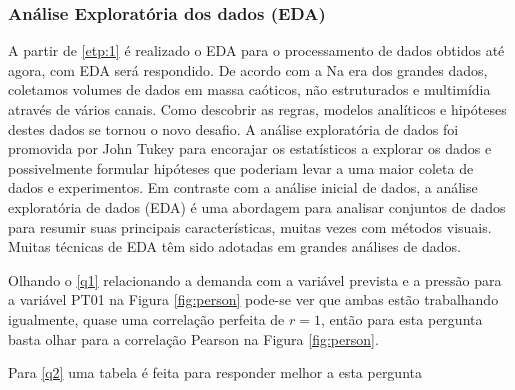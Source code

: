 \subsubsection{An\'alise Explorat\'oria dos dados (EDA)}

A partir de \ref{etp:1} é realizado o EDA para o processamento de dados obtidos até agora, com EDA será respondido. De acordo com a  Na era dos grandes dados, coletamos volumes de dados em massa caóticos, não estruturados e multimídia através de vários canais. Como descobrir as regras, modelos analíticos e hipóteses destes dados se tornou o novo desafio. A análise exploratória de dados foi promovida por John Tukey para encorajar os estatísticos a explorar os dados e possivelmente formular hipóteses que poderiam levar a uma maior coleta de dados e experimentos. Em contraste com a análise inicial de dados, a análise exploratória de dados (EDA) é uma abordagem para analisar conjuntos de dados para resumir suas principais características, muitas vezes com métodos visuais. Muitas técnicas de EDA têm sido adotadas em grandes análises de dados.

Olhando o \ref{q1} relacionando a demanda com a variável prevista e a pressão para a variável PT01 na Figura \ref{fig:person} pode-se ver que ambas estão trabalhando igualmente, quase uma correlação perfeita de $r=1$, então para esta pergunta basta olhar para a correlação Pearson na Figura \ref{fig:person}. 

Para \ref{q2} uma tabela é feita para responder melhor a esta pergunta


